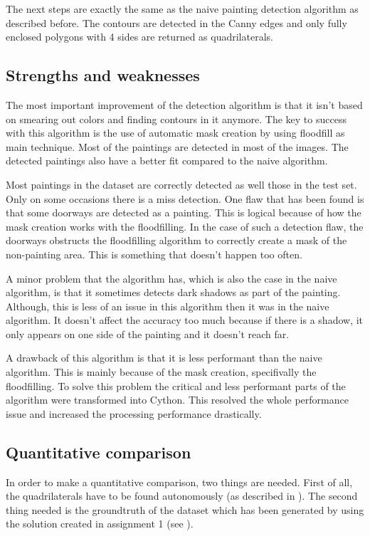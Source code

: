 The next steps are exactly the same as the naive painting detection algorithm as described before. The contours are detected in the Canny edges and only fully enclosed polygons with 4 sides are returned as quadrilaterals.

\subsection{Strengths and weaknesses}

The most important improvement of the detection algorithm is that it isn't based on smearing out colors and finding contours in it anymore. The key to success with this algorithm is the use of automatic mask creation by using floodfill as main technique. Most of the paintings are detected in most of the images. The detected paintings also have a better fit compared to the naive algorithm.

Most paintings in the dataset are correctly detected as well those in the test set. Only on some occasions there is a miss detection. One flaw that has been found is that some doorways are detected as a painting. This is logical because of how the mask creation works with the floodfilling. In the case of such a detection flaw, the doorways obstructs the floodfilling algorithm to correctly create a mask of the non-painting area. This is something that doesn't happen too often.

A minor problem that the algorithm has, which is also the case in the naive algorithm, is that it sometimes detects dark shadows as part of the painting. Although, this is less of an issue in this algorithm then it was in the naive algorithm. It doesn't affect the accuracy too much because if there is a shadow, it only appears on one side of the painting and it doesn't reach far.

A drawback of this algorithm is that it is less performant than the naive algorithm. This is mainly because of the mask creation, specifivally the floodfilling. To solve this problem the critical and less performant parts of the algorithm were transformed into Cython. This resolved the whole performance issue and increased the processing performance drastically.

\subsection{Quantitative comparison}
In order to make a quantitative comparison, two things are needed. First of all, the quadrilaterals have to be found autonomously (as described in ). The second thing needed is the groundtruth of the dataset which has been generated by using the solution created in assignment 1 (see ).

